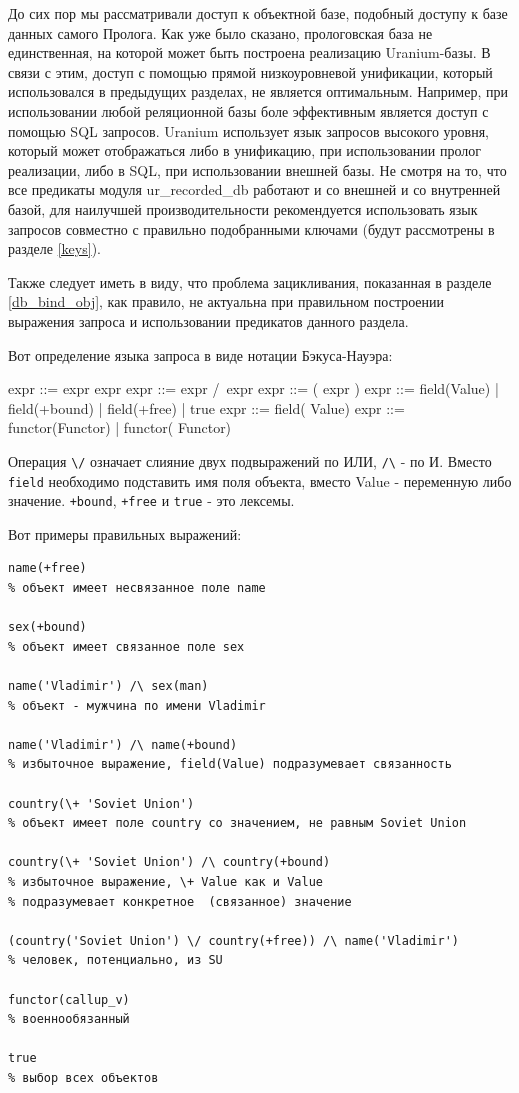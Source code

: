 \documentclass[a4paper]{book}
\def\ur{Uranium}
\begin{document}
До сих пор мы рассматривали доступ к объектной базе, подобный
доступу к базе данных самого Пролога. Как уже было сказано,
прологовская база не единственная, на которой может быть
построена реализацию \ur-базы. В связи с этим, доступ с помощью
прямой низкоуровневой унификации, который использовался в
предыдущих разделах, не является оптимальным. Например, при
использовании любой реляционной базы боле эффективным является
доступ с помощью SQL запросов. \ur{} использует язык запросов
высокого уровня, который может отображаться либо в унификацию,
при использовании пролог реализации, либо в SQL, при
использовании внешней базы. Не смотря на то, что все предикаты
модуля ur\_recorded\_db работают и со внешней и со внутренней
базой, для наилучшей производительности рекомендуется
использовать язык запросов совместно с правильно подобранными
ключами (будут рассмотрены в разделе \ref{keys}).

Также следует иметь в виду, что проблема зацикливания, показанная
в разделе \ref{db_bind_obj}, как правило, не актуальна при
правильном построении выражения запроса и использовании
предикатов данного раздела.

Вот определение языка запроса в виде нотации Бэкуса-Науэра:

\begin{genexample}{}{}
expr ::= expr \/ expr
expr ::= expr /\ expr
expr ::= ( expr )
expr ::= field(Value) | field(+bound) | field(+free) | true
expr ::= field(\+ Value)
expr ::= functor(Functor) | functor(\+ Functor)
\end{genexample}
 
Операция \verb|\/| означает слияние двух подвыражений по ИЛИ,
\verb|/\| - по И. Вместо \verb|field| необходимо подставить имя
поля объекта, вместо Value - переменную либо
значение. \verb|+bound|, \verb|+free| и \verb|true| - это
лексемы.

Вот примеры правильных выражений:

\begin{verbatim}
name(+free)   
% объект имеет несвязанное поле name

sex(+bound)   
% объект имеет связанное поле sex

name('Vladimir') /\ sex(man) 
% объект - мужчина по имени Vladimir

name('Vladimir') /\ name(+bound) 
% избыточное выражение, field(Value) подразумевает связанность

country(\+ 'Soviet Union') 
% объект имеет поле country со значением, не равным Soviet Union

country(\+ 'Soviet Union') /\ country(+bound) 
% избыточное выражение, \+ Value как и Value 
% подразумевает конкретное  (связанное) значение

(country('Soviet Union') \/ country(+free)) /\ name('Vladimir') 
% человек, потенциально, из SU

functor(callup_v)
% военнообязанный

true
% выбор всех объектов
\end{verbatim}
\end{document}
